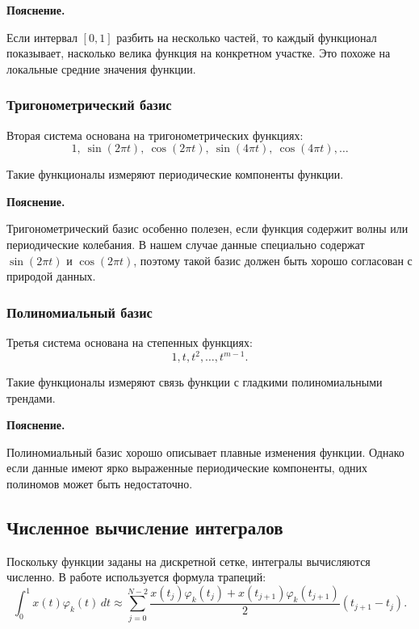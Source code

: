 \documentclass[14pt,a4paper]{extarticle}
\newenvironment{explanation}
{
    \vspace{0.2cm}
    \noindent\textbf{Пояснение.}
}
{
    \vspace{0.2cm}
}
\begin{document}
\begin{explanation}
Если интервал \([0,1]\) разбить на несколько частей, то каждый функционал показывает, насколько велика функция на конкретном участке. Это похоже на локальные средние значения функции.
\end{explanation}

\subsubsection{Тригонометрический базис}

Вторая система основана на тригонометрических функциях:
\[
1,\ \sin(2\pi t),\ \cos(2\pi t),\ \sin(4\pi t),\ \cos(4\pi t),\dots
\]

Такие функционалы измеряют периодические компоненты функции.

\begin{explanation}
Тригонометрический базис особенно полезен, если функция содержит волны или периодические колебания. В нашем случае данные специально содержат \(\sin(2\pi t)\) и \(\cos(2\pi t)\), поэтому такой базис должен быть хорошо согласован с природой данных.
\end{explanation}

\subsubsection{Полиномиальный базис}

Третья система основана на степенных функциях:
\[
1,t,t^2,\dots,t^{m-1}.
\]

Такие функционалы измеряют связь функции с гладкими полиномиальными трендами.

\begin{explanation}
Полиномиальный базис хорошо описывает плавные изменения функции. Однако если данные имеют ярко выраженные периодические компоненты, одних полиномов может быть недостаточно.
\end{explanation}

\subsection{Численное вычисление интегралов}

Поскольку функции заданы на дискретной сетке, интегралы вычисляются численно. В работе используется формула трапеций:
\[
\int_0^1 x(t)\varphi_k(t)\,dt
\approx
\sum_{j=0}^{N-2}
\frac{
x(t_j)\varphi_k(t_j)+x(t_{j+1})\varphi_k(t_{j+1})
}{2}
(t_{j+1}-t_j).
\]
\end{document}
